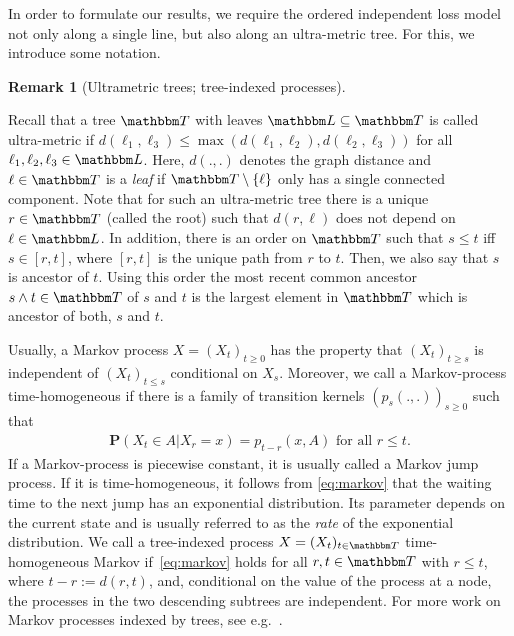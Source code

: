 \documentclass[preprint,authoryear]{elsarticle}
\theoremstyle{definition}
\newtheorem{remark}[proposition]{Remark}
\numberwithin{equation}{section}
\numberwithin{figure}{section}
\begin{document}
\sloppy In order to formulate our results, we require the ordered
independent loss model not only along a single line, but also along an
ultra-metric tree. For this, we introduce some notation.

\begin{remark}[Ultrametric trees; tree-indexed processes]
\label{rem:notUltra}
  \begin{asparaenum}
  \item Recall that a tree $\mathbbm T$ with leaves
    $\mathbbm L\subseteq \mathbbm T$ is called ultra-metric if
    $d(\ell_1,\ell_3)\leq \max(d(\ell_1, \ell_2), d(\ell_2,\ell_3))$
    for all $\ell_1, \ell_2, \ell_3\in\mathbbm L$. Here, $d(.,.)$
    denotes the graph distance and $\ell\in\mathbbm T$ is a
    \emph{leaf} if $\mathbbm T\setminus\{\ell\}$ only has a single
    connected component. Note that for such an ultra-metric tree there
    is a unique $r\in\mathbbm T$ (called the root) such that
    $d(r, \ell)$ does not depend on $\ell \in\mathbbm L$.  In
    addition, there is an order on $\mathbbm T$ such that $s\leq t$
    iff $s \in [r,t]$, where $[r,t]$ is the unique path from $r$ to
    $t$.  Then, we also say that $s$ is ancestor of $t$.  Using this
    order the most recent common ancestor $s\wedge t \in \mathbbm T$
    of $s$ and $t$ is the largest element in $\mathbbm T$ which is
    ancestor of both, $s$ and $t$.
  \item Usually, a Markov process $X = (X_t)_{t\geq 0}$ has the
    property that $(X_t)_{t\geq s}$ is independent of
    $(X_t)_{t\leq s}$ conditional on $X_s$. 
    Moreover, we call a Markov-process time-homogeneous if
    there is a family of transition kernels
    $(p_s(.,.))_{s\geq 0}$ such that
    \begin{align}
      \label{eq:markov}
      \mathbf P(X_t\in A|X_r=x) = p_{t-r}(x,A) \text{ for all }r\leq t.
    \end{align}
    If a Markov-process is piecewise constant, it is usually called a Markov jump process. 
    If it is time-homogeneous, it follows from \eqref{eq:markov} that the waiting time to 
    the next jump has an exponential distribution. Its parameter depends on the current
    state and is usually referred to as the {\it rate} of the exponential distribution.
    We call a tree-indexed process $X = (X_t)_{t\in \mathbbm T}$
    time-homogeneous Markov if~\eqref{eq:markov} holds for all
    $r,t\in\mathbbm T$ with $r\leq t$, where $t-r := d(r,t)$, and, 
    conditional on the value of the process at a node, the processes in the
    two descending subtrees are independent. For more
    work on Markov processes indexed by trees, see e.g.\
    \cite{benjamini}.
  \end{asparaenum}
\end{remark}
\end{document}

